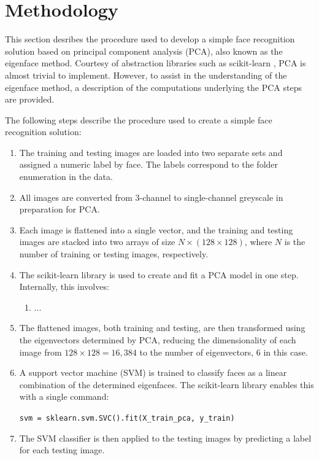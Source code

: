 \newpage
\section{Methodology}

This section desribes the procedure used to develop a simple face recognition solution based on principal component analysis (PCA), also known as the eigenface method. Courtesy of abstraction libraries such as scikit-learn \cite{scikitlearn_2023}, PCA is almost trivial to implement. However, to assist in the understanding of the eigenface method, a description of the computations underlying the PCA steps are provided.

The following steps describe the procedure used to create a simple face recognition solution:

\begin{enumerate}
  \item The training and testing images are loaded into two separate sets and assigned a numeric label by face. The labels correspond to the folder enumeration in the data.

  \item All images are converted from 3-channel to single-channel greyscale in preparation for PCA.

  \item Each image is flattened into a single vector, and the training and testing images are stacked into two arrays of size $N\times(128\times128)$, where $N$ is the number of training or testing images, respectively.

  \item The scikit-learn library is used to create and fit a PCA model in one step. Internally, this involves:

  \begin{enumerate}
    \item ...

  \end{enumerate}

  \item The flattened images, both training and testing, are then transformed using the eigenvectors determined by PCA, reducing the dimensionality of each image from $128\times128=16,384$ to the number of eigenvectors, 6 in this case.

  \item A support vector machine (SVM) is trained to classify faces as a linear combination of the determined eigenfaces. The scikit-learn library enables this with a single command:

  \begin{center}
    \texttt{svm = sklearn.svm.SVC().fit(X\_train\_pca, y\_train)}
  \end{center}

  \item The SVM classifier is then applied to the testing images by predicting a label for each testing image.

\end{enumerate}

